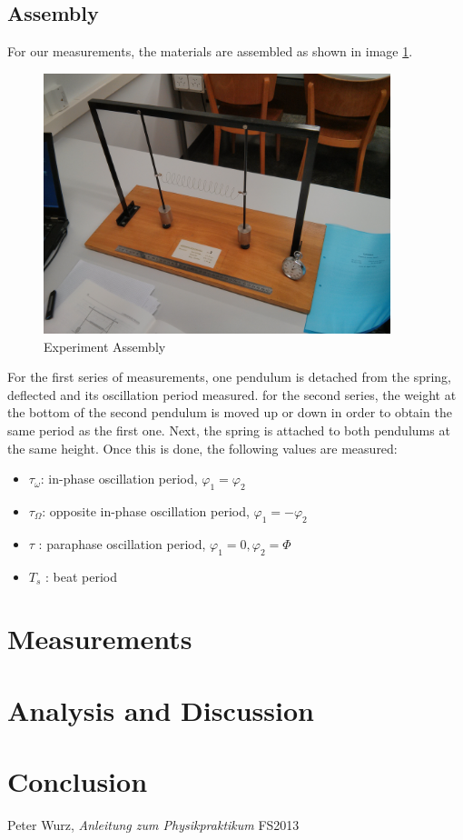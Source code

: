 \documentclass{scrreprt}
\renewcommand{\phi}{\varphi}
\begin{document}
\subsection{Assembly}
For our measurements, the materials are assembled as shown in image \ref{fig:assembly}.

\begin{figure}[H]
	\centering
  \includegraphics[width=0.9\textwidth]{img/assembly.jpg}
	\caption{Experiment Assembly}
	\label{fig:assembly}
\end{figure}
For the first series of measurements, one pendulum is detached from the spring, deflected and its oscillation period measured. for the second series, the weight at the bottom of the second pendulum is moved up or down in order to obtain the same period as the first one. Next, the spring is attached to both pendulums at the same height. Once this is done, the following values are measured:
\begin{itemize}
\item $\tau_{\omega}$: in-phase oscillation period, $\phi_1 = \phi_2$
\item $\tau_{\Omega}$: opposite in-phase oscillation period, $\phi_1 = -\phi_2$
\item $\tau$ : paraphase oscillation period, $\phi_1 = 0, \phi_2 = \Phi$
\item $T_s$ : beat period
\end{itemize}
\section{Measurements}

\section{Analysis and Discussion}

\section{Conclusion}

\begin{thebibliography}{9}

  Peter Wurz,
  \emph{Anleitung zum Physikpraktikum}
  FS2013

\end{thebibliography}
\end{document}
